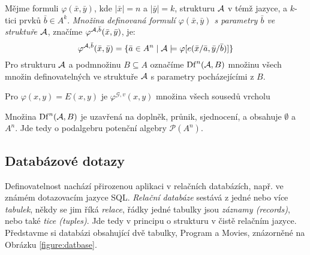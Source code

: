 \begin{definition}
    Mějme formuli $\varphi(\bar x,\bar y)$, kde $|\bar x|=n$ a $|\bar y|=k$, strukturu $\mathcal{A}$ v témž jazyce, a $k$-tici prvků $\bar b\in A^k$. \emph{Množina definovaná formulí $\varphi(\bar x,\bar y)$ s parametry $\bar b$ ve struktuře $\mathcal{A}$}, značíme $\varphi^{\mathcal{A},\bar b}(\bar x,\bar y)$, je:
    $$
    \varphi^{\mathcal{A},\bar b}(\bar x,\bar y)=\{\bar a\in A^n\mid\mathcal{A}\models\varphi[e(\bar x/\bar a,\bar y/\bar b)]\}
    $$
    Pro strukturu $\mathcal{A}$ a podmnožinu $B\subseteq A$ označíme $\mathrm{Df}^n(\mathcal{A},B)$ množinu všech množin definovatelných ve struktuře $\mathcal{A}$ s parametry pocházejícími z $B$.
\end{definition}


\begin{example}
    Pro  $\varphi(x,y)=E(x,y)$ je $\varphi^{\mathcal G,v}(x,y)$ množina všech sousedů vrcholu 
\end{example}

\begin{observation}
Množina $\mathrm{Df}^n(\mathcal{A},B)$ je uzavřená na doplněk, průnik, sjednocení, a obsahuje $\emptyset$ a $A^n$. Jde tedy o podalgebru potenční algebry $\mathcal P(A^n)$.
\end{observation}

\subsection{Databázové dotazy}

Definovatelnost nachází přirozenou aplikaci v relačních databázích, např. ve známém dotazovacím jazyce SQL. \emph{Relační databáze} sestává z jedné nebo více \emph{tabulek}, někdy se jim říká \emph{relace}, řádky jedné tabulky jsou \emph{záznamy (records)}, nebo také \emph{tice (tuples)}. Jde tedy v principu o strukturu v čistě relačním jazyce. Představme si databázi obsahující dvě tabulky, Program a Movies, znázorněné na Obrázku \ref{figure:datbase}.


